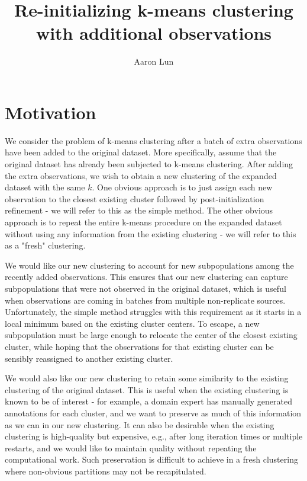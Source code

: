 \documentclass{article}
\title{Re-initializing k-means clustering with additional observations}
\author[1]{Aaron Lun}
\affil[1]{Genentech, Inc. South San Francisco, CA}
\begin{document}
\maketitle

\section{Motivation}

We consider the problem of k-means clustering \cite{lloyd1982least} after a batch of extra observations have been added to the original dataset.
More specifically, assume that the original dataset has already been subjected to k-means clustering.
After adding the extra observations, we wish to obtain a new clustering of the expanded dataset with the same $k$.
One obvious approach is to just assign each new observation to the closest existing cluster followed by post-initialization refinement - we will refer to this as the simple method.
The other obvious approach is to repeat the entire k-means procedure on the expanded dataset without using any information from the existing clustering - we will refer to this as a "fresh" clustering.

We would like our new clustering to account for new subpopulations among the recently added observations.
This ensures that our new clustering can capture subpopulations that were not observed in the original dataset,
which is useful when observations are coming in batches from multiple non-replicate sources.
Unfortunately, the simple method struggles with this requirement as it starts in a local minimum based on the existing cluster centers.
To escape, a new subpopulation must be large enough to relocate the center of the closest existing cluster, 
while hoping that the observations for that existing cluster can be sensibly reassigned to another existing cluster.

We would also like our new clustering to retain some similarity to the existing clustering of the original dataset.
This is useful when the existing clustering is known to be of interest - 
for example, a domain expert has manually generated annotations for each cluster,
and we want to preserve as much of this information as we can in our new clustering.
It can also be desirable when the existing clustering is high-quality but expensive, e.g., after long iteration times or multiple restarts,
and we would like to maintain quality without repeating the computational work.
Such preservation is difficult to achieve in a fresh clustering where non-obvious partitions may not be recapitulated.
\end{document}
